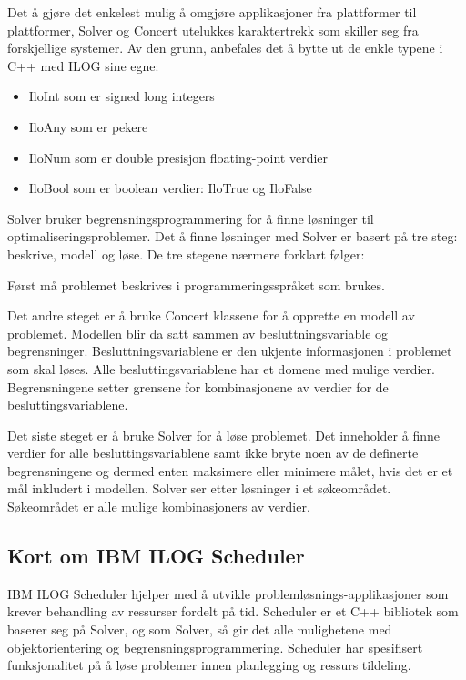 Det å gjøre det enkelest mulig å omgjøre applikasjoner fra plattformer til plattformer, Solver og Concert utelukkes karaktertrekk som skiller seg fra forskjellige systemer. Av den grunn, anbefales det å bytte ut de enkle typene i C++ med ILOG sine egne:
\begin{itemize}
\item IloInt som er signed long integers
\item IloAny som er pekere
\item IloNum som er double presisjon floating-point verdier
\item IloBool som er boolean verdier: IloTrue og IloFalse
\end{itemize}
Solver bruker begrensningsprogrammering for å finne løsninger til optimaliseringsproblemer. Det å finne løsninger med Solver er basert på tre steg: beskrive, modell og løse. De tre stegene nærmere forklart følger:

Først må problemet beskrives i programmeringsspråket som brukes.

Det andre steget er å bruke Concert klassene for å opprette en modell av problemet. Modellen blir da satt sammen av besluttningsvariable og begrensninger. Besluttningsvariablene er den ukjente informasjonen i problemet som skal løses. Alle besluttingsvariablene har et domene med mulige verdier. Begrensningene setter grensene for kombinasjonene av verdier for de besluttingsvariablene.

Det siste steget er å bruke Solver for å løse problemet. Det inneholder å finne verdier for alle besluttingsvariablene samt ikke bryte noen av de definerte begrensningene og dermed enten maksimere eller minimere målet, hvis det er et mål inkludert i modellen. Solver ser etter løsninger i et søkeområdet. Søkeområdet er alle mulige kombinasjoners av verdier.\cite{cpsolverilog}

\subsection{Kort om IBM ILOG Scheduler}
IBM ILOG Scheduler hjelper med å utvikle problemløsnings-applikasjoner som krever behandling av ressurser fordelt på tid. Scheduler er et C++ bibliotek som baserer seg på Solver, og som Solver, så gir det alle mulighetene med objektorientering og begrensningsprogrammering. Scheduler har spesifisert funksjonalitet på å løse problemer innen planlegging og ressurs tildeling.\cite{cpschedulerilog}

